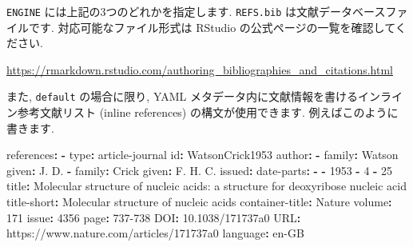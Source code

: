 \documentclass[
]{ltjsarticle}
\newenvironment{Shaded}{\begin{snugshade}}{\end{snugshade}}
\newcommand{\AttributeTok}[1]{\textcolor[rgb]{0.77,0.63,0.00}{#1}}
\newcommand{\DecValTok}[1]{\textcolor[rgb]{0.00,0.00,0.81}{#1}}
\newcommand{\FunctionTok}[1]{\textcolor[rgb]{0.00,0.00,0.00}{#1}}
\newcommand{\KeywordTok}[1]{\textcolor[rgb]{0.13,0.29,0.53}{\textbf{#1}}}
\newcommand{\StringTok}[1]{\textcolor[rgb]{0.31,0.60,0.02}{#1}}
\begin{document}
\texttt{ENGINE} には上記の3つのどれかを指定します. \texttt{REFS.bib} は文献データベースファイルです. 対応可能なファイル形式は RStudio の公式ページの一覧を確認してください.

\url{https://rmarkdown.rstudio.com/authoring_bibliographies_and_citations.html}

また, \texttt{default} の場合に限り, YAML メタデータ内に文献情報を書けるインライン参考文献リスト (inline references) の構文が使用できます. 例えばこのように書きます.

\begin{Shaded}
\begin{Highlighting}[]
\FunctionTok{references}\KeywordTok{:}
\AttributeTok{  }\KeywordTok{{-}}\AttributeTok{ }\FunctionTok{type}\KeywordTok{:}\AttributeTok{ article{-}journal}
\AttributeTok{    }\FunctionTok{id}\KeywordTok{:}\AttributeTok{ WatsonCrick1953}
\AttributeTok{    }\FunctionTok{author}\KeywordTok{:}
\AttributeTok{    }\KeywordTok{{-}}\AttributeTok{ }\FunctionTok{family}\KeywordTok{:}\AttributeTok{ Watson}
\AttributeTok{      }\FunctionTok{given}\KeywordTok{:}\AttributeTok{ J. D.}
\AttributeTok{    }\KeywordTok{{-}}\AttributeTok{ }\FunctionTok{family}\KeywordTok{:}\AttributeTok{ Crick}
\AttributeTok{      }\FunctionTok{given}\KeywordTok{:}\AttributeTok{ F. H. C.}
\AttributeTok{    }\FunctionTok{issued}\KeywordTok{:}
\AttributeTok{      }\FunctionTok{date{-}parts}\KeywordTok{:}
\AttributeTok{      }\KeywordTok{{-}}\AttributeTok{ }\KeywordTok{{-}}\AttributeTok{ }\DecValTok{1953}
\AttributeTok{        }\KeywordTok{{-}}\AttributeTok{ }\DecValTok{4}
\AttributeTok{        }\KeywordTok{{-}}\AttributeTok{ }\DecValTok{25}
\AttributeTok{    }\FunctionTok{title}\KeywordTok{:}\AttributeTok{ }\StringTok{\textquotesingle{}Molecular structure of nucleic acids: a structure for}
\StringTok{      deoxyribose nucleic acid\textquotesingle{}}
\AttributeTok{    }\FunctionTok{title{-}short}\KeywordTok{:}\AttributeTok{ Molecular structure of nucleic acids}
\AttributeTok{    }\FunctionTok{container{-}title}\KeywordTok{:}\AttributeTok{ Nature}
\AttributeTok{    }\FunctionTok{volume}\KeywordTok{:}\AttributeTok{ }\DecValTok{171}
\AttributeTok{    }\FunctionTok{issue}\KeywordTok{:}\AttributeTok{ }\DecValTok{4356}
\AttributeTok{    }\FunctionTok{page}\KeywordTok{:}\AttributeTok{ 737{-}738}
\AttributeTok{    }\FunctionTok{DOI}\KeywordTok{:}\AttributeTok{ 10.1038/171737a0}
\AttributeTok{    }\FunctionTok{URL}\KeywordTok{:}\AttributeTok{ https://www.nature.com/articles/171737a0}
\AttributeTok{    }\FunctionTok{language}\KeywordTok{:}\AttributeTok{ en{-}GB}
\end{Highlighting}
\end{Shaded}
\end{document}

